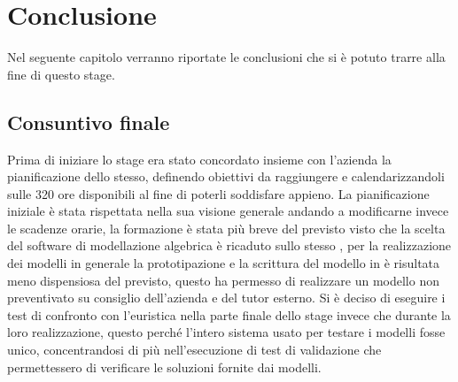
\hypertarget{(chap:capitolo8)}{}
\chapter{Conclusione}
Nel seguente capitolo verranno riportate le conclusioni che si è potuto trarre alla fine di questo stage.
\section{Consuntivo finale}
Prima di iniziare lo stage era stato concordato insieme con l'azienda la pianificazione dello stesso, definendo obiettivi da raggiungere e calendarizzandoli sulle 320 ore disponibili al fine di poterli soddisfare appieno. La pianificazione iniziale è stata rispettata nella sua visione generale andando a modificarne invece le scadenze orarie, la formazione è stata più breve del previsto visto che la scelta del software di modellazione algebrica è ricaduto sullo stesso , per la realizzazione dei modelli in generale la prototipazione e la scrittura del modello in  è risultata meno dispensiosa del previsto, questo ha permesso di realizzare un modello non preventivato su consiglio dell'azienda e del tutor esterno.
Si è deciso di eseguire i test di confronto con l'euristica nella parte finale dello stage invece che durante la loro realizzazione, questo perché l'intero sistema usato per testare i modelli fosse unico, concentrandosi di più nell'esecuzione di test di validazione che permettessero di verificare le soluzioni fornite dai modelli.

